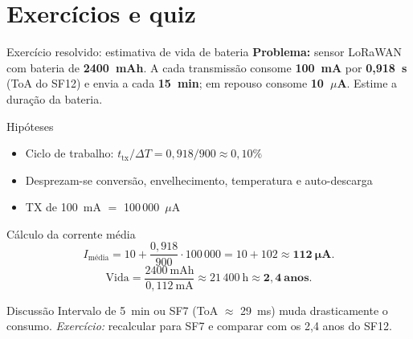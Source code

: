 \documentclass[aspectratio=169,11pt]{beamer}
\begin{document}
\section{Exercícios e quiz}

\begin{frame}{Exercício resolvido: estimativa de vida de bateria}
  \footnotesize
  \textbf{Problema:} sensor LoRaWAN com bateria de \textbf{2400~mAh}. A cada transmissão consome \textbf{100~mA} por \textbf{0,918~s} (ToA do SF12) e envia a cada \textbf{15~min}; em repouso consome \textbf{10~$\mu$A}. Estime a duração da bateria.
  \pause
  \begin{block}{Hipóteses}
    \begin{itemize}
      \item Ciclo de trabalho: $t_{\text{tx}}/\Delta T = 0{,}918/900 \approx 0{,}10\%$
      \item Desprezam-se conversão, envelhecimento, temperatura e auto-descarga
      \item TX de 100~mA $=$ 100\,000~$\mu$A
    \end{itemize}
  \end{block}
  \pause
  \begin{block}{Cálculo da corrente média}
    \[
      I_{\text{média}} = 10 + \frac{0{,}918}{900}\cdot 100\,000 = 10 + 102 \approx \mathbf{112~\mu A}.
    \]
    \[
      \text{Vida} = \frac{2400~\text{mAh}}{0{,}112~\text{mA}} \approx 21\,400~\text{h} \approx \mathbf{2{,}4~\text{anos}}.
    \]
  \end{block}
  \pause
  \begin{alertblock}{Discussão}
    Intervalo de 5~min ou SF7 (ToA $\approx$ 29~ms) muda drasticamente o consumo. \emph{Exercício:} recalcular para SF7 e comparar com os 2,4 anos do SF12.
  \end{alertblock}
\end{frame}
\end{document}

